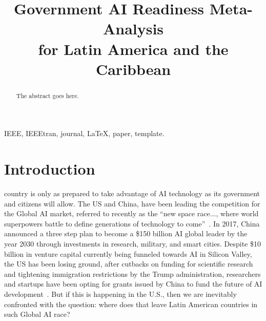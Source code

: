 \documentclass[conference]{IEEEtran}
\begin{document}
\title{Government AI Readiness Meta-Analysis\\for Latin America and the Caribbean 
}

\author{
\and
{}
}

\maketitle

\begin{abstract}
The abstract goes here.
\end{abstract}

\begin{IEEEkeywords}
IEEE, IEEEtran, journal, \LaTeX, paper, template.
\end{IEEEkeywords}



\section{Introduction}

 country is only as prepared to take advantage of AI technology as its government and citizens will allow. The US and China, have been leading the competition for the Global AI market, referred to recently as the ``new space race..., where world superpowers battle to define generations of technology to come''~\cite{gershgorn2018ai}. In 2017, China announced a three step plan to become a \$150 billion AI global leader by the year 2030 through investments in research, military, and smart cities. Despite \$10 billion in venture capital currently being funneled towards AI in Silicon Valley, the US has been losing ground, after cutbacks on funding for scientific research and tightening immigration restrictions by the Trump administration, researchers and startups have been opting for grants issued by China to fund the future of AI development~\cite{mozur2017china}. But if this is happening in the U.S., then we are inevitably confronted with the question: where does that leave Latin American countries in such Global AI race?
\end{document}
